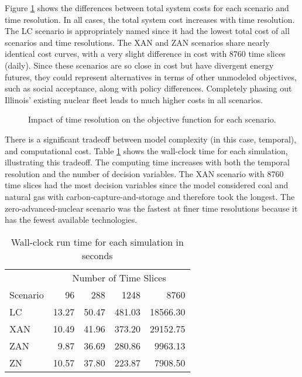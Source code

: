 Figure \ref{fig:time_res_cost} shows the differences between total system costs
for each scenario and time resolution.
In all cases, the total system cost increases with time resolution. The \gls{LC}
scenario is appropriately named since it had the lowest total cost
of all scenarios and time resolutions. The \gls{XAN} and \gls{ZAN} scenarios share
nearly identical cost curves,
with a very slight difference in cost with 8760 time slices (daily). Since these
scenarios are so close in cost but have divergent energy futures, they could represent
alternatives in terms of other unmodeled objectives, such as social acceptance,
along with policy differences. Completely phasing out Illinois' existing nuclear
fleet leads to much higher costs in all scenarios.

\begin{figure}[H]
  \centering
  \resizebox{0.75\columnwidth}{!}{}
  \caption{Impact of time resolution on the objective function for each scenario.}
  \label{fig:time_res_cost}
\end{figure}



There is a significant tradeoff between model complexity (in this case, temporal),
and computational cost. Table \ref{tab:time_res_clock} shows the
wall-clock time for each simulation, illustrating this tradeoff.
The computing time increases with both the temporal resolution and the number of
decision variables. The \gls{XAN} scenario with 8760 time slices had the most decision
variables since the model considered coal and natural gas with
carbon-capture-and-storage and therefore took the longest. The zero-advanced-nuclear
scenario was the fastest at finer time resolutions because it has the fewest
available technologies.

\begin{table}[H]
  \centering
  \caption{Wall-clock run time for each simulation in seconds}
  \label{tab:time_res_clock}
  \begin{tabular}{l*{4}{r}}
    \toprule
    & \multicolumn{4}{c}{Number of Time Slices}\\
    Scenario & 96 & 288 & 1248&8760\\
    \midrule
    LC &13.27&50.47&481.03&18566.30\\
    XAN &10.49&41.96&373.20&29152.75\\
    ZAN &9.87&36.69&280.86&9963.13\\
    ZN & 10.57&37.80&223.87&7908.50\\
    \bottomrule
  \end{tabular}
\end{table}


